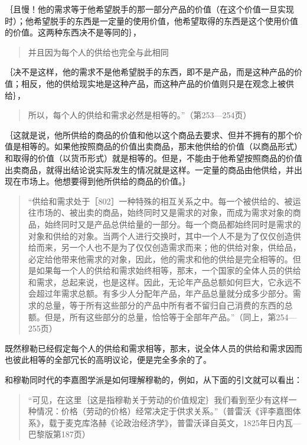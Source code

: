 ｛且慢！他的需求等于他希望脱手的那一部分产品的价值（在这个价值一旦实现时）；他希望脱手的东西是一定量的使用价值，他希望取得的东西是这个使用价值的价值。这两种东西决不是等同的｝，

\begin{quote}{并且因为每个人的供给也完全与此相同}\end{quote}

｛决不是这样，他的需求不是他希望脱手的东西，即不是产品，而是这种产品的价值；相反，他的供给现实地是这种产品，而这种产品的价值则只是在观念上被供给｝，

\begin{quote}{所以，每个人的供给和需求必然是相等的。”（第253—254页）}\end{quote}

｛这就是说，他所供给的商品的价值和他以这个商品去要求、但并不拥有的那个价值是相等的。如果他按照商品的价值出卖商品，那末他供给的价值（以商品形式）和取得的价值（以货币形式）就是相等的。但是，不能由于他希望按照商品的价值出卖商品，就得出结论说实际发生的情况就是这样。一定量的商品由他供给，并出现在市场上。他想要得到他所供给的商品的价值。｝

\begin{quote}{“供给和需求处于［802］一种特殊的相互关系之中。每一个被供给的、被运往市场的、被出卖的商品，始终同时又是需求的对象，而成为需求对象的商品，始终同时又是产品总供给量的一部分。每一个商品都始终同时是需求的对象和供给的对象。当两个人进行交换时，其中一个人不是为了仅仅创造供给而来，另一个人也不是为了仅仅创造需求而来；他的供给对象，供给品，必定给他带来他需求的对象，因此，他的需求和他的供给是完全相等的。但是如果每一个人的供给和需求始终相等，那末，一个国家的全体人员的供给和需求，总起来说，也是这样。因此，无论年产品总额如何巨大，它永远不会超过年需求总额。有多少人分配年产品，年产品总量就分成多少部分。需求的总量，等于所有这些部分的产品中所有者不留归自己消费的东西的总额。但是，所有这些部分的总量，恰恰等于全部年产品。”（同上，第254—255页）}\end{quote}

既然穆勒已经假定每个人的供给和需求相等，那末，说全体人员的供给和需求因而也彼此相等的全部冗长的高明议论，便是完全多余的了。


和穆勒同时代的李嘉图学派是如何理解穆勒的，例如，从下面的引文就可以看出：

\begin{quote}{“可见，在这里｛这是指穆勒关于劳动的价值规定｝我们看到至少有这样一种情况：价格（劳动的价格）经常决定于供求关系。”（普雷沃《评李嘉图体系》，载于麦克库洛赫《论政治经济学》，普雷沃译自英文，1825年日内瓦—巴黎版第187页）}\end{quote}

